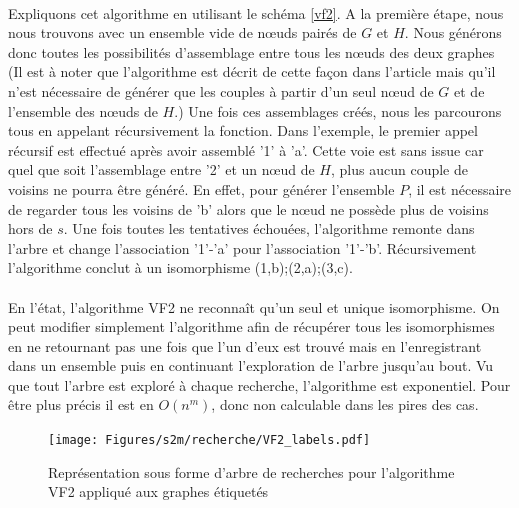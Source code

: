 \documentclass[12pt,french,twoside]{report}
\begin{document}
\paragraph{}Expliquons cet algorithme en utilisant le schéma \ref{vf2}.
A la première étape, nous nous trouvons avec un ensemble vide de n\oe{}uds pairés de $G$ et $H$.
Nous générons donc toutes les possibilités d'assemblage entre tous les n\oe{}uds des deux graphes (Il est à noter que l'algorithme
est décrit de cette façon dans l'article mais qu'il n'est nécessaire de générer que les couples à partir d'un seul n\oe{}ud de $G$
et de l'ensemble des n\oe{}uds de $H$.)
Une fois ces assemblages créés, nous les parcourons tous en appelant récursivement la fonction.
Dans l'exemple, le premier appel récursif est effectué après avoir assemblé '1' à 'a'.
Cette voie est sans issue car quel que soit l'assemblage entre '2' et un n\oe{}ud de $H$, plus aucun couple de voisins ne pourra être
généré.
En effet, pour générer l'ensemble $P$, il est nécessaire de regarder tous les voisins de 'b' alors que le n\oe{}ud ne possède plus
de voisins hors de $s$.
Une fois toutes les tentatives échouées, l'algorithme remonte dans l'arbre et change l'association '1'-'a' pour l'association
'1'-'b'.
Récursivement l'algorithme conclut à un isomorphisme {(1,b);(2,a);(3,c)}.

\paragraph{}En l'état, l'algorithme VF2 ne reconnaît qu'un seul et unique isomorphisme.
On peut modifier simplement l'algorithme afin de récupérer tous les isomorphismes en ne retournant pas une fois que l'un d'eux est
trouvé mais en l'enregistrant dans un ensemble puis en continuant l'exploration de l'arbre jusqu'au bout.
Vu que tout l'arbre est exploré à chaque recherche, l'algorithme est exponentiel.
Pour être plus précis il est en $O(n^m)$, donc non calculable dans les pires des cas.

\begin{figure}[!ht]
  \texttt{[image: Figures/s2m/recherche/VF2\_labels.pdf]}
  \caption{\label{vf2_labels}Représentation sous forme d'arbre de recherches pour l'algorithme VF2 appliqué aux graphes étiquetés}
\end{figure}
\end{document}
